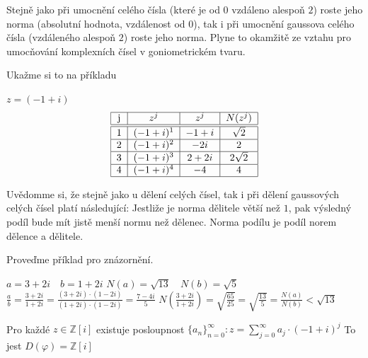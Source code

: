 \documentclass[czech,bachelor,dept470,male]{diploma}
\begin{document}
\begin{remark}
	Stejně jako při umocnění celého čísla (které je od $0$ vzdáleno alespoň $2$) roste jeho norma (absolutní hodnota, vzdálenost od $0$), tak i při umocnění gaussova celého čísla (vzdáleného alespoň $2$) roste jeho norma. Plyne to okamžitě ze vztahu pro umocňování komplexních čísel v goniometrickém tvaru.
\end{remark}
Ukažme si to na příkladu
\begin{example}
	$z=(-1+i)$
	\begin{equation}
		\begin{tabular}{|c|c|c|c|}\hline
			j & $z^j$      & $z^j$  & $N(z^j)$    \\ \hline\hline
			1 & $(-1+i)^1$ & $-1+i$ & $\sqrt{2}$  \\ \hline
			2 & $(-1+i)^2$ & $-2i$  & 2           \\ \hline
			3 & $(-1+i)^3$ & $2+2i$ & $2\sqrt{2}$ \\ \hline
			4 & $(-1+i)^4$ & $-4$   & 4           \\ \hline
		\end{tabular}
	\end{equation}
\end{example}
\begin{remark}\label{divisionNormRemark}
	Uvědomme si, že stejně jako u dělení celých čísel, tak i při dělení gaussových celých čísel platí následující:\newline
	Jestliže je norma dělitele větší než $1$, pak výsledný podíl bude mít jistě menší normu než dělenec. Norma podílu je podíl norem dělence a dělitele.
\end{remark}Proveďme příklad pro znázornění.
\begin{example}
	$a=3+2i\quad b=1+2i$\newline
	$N(a) = \sqrt{13} \quad N(b)= \sqrt{5}$\newline
	$\frac{a}{b}=\frac{3+2i}{1+2i}=\frac{(3+2i)\cdot(1-2i)}{(1+2i)\cdot(1-2i)}=\frac{7-4i}{5}$\newline
	$N\left(\frac{3+2i}{1+2i}\right)=\sqrt{\frac{65}{25}}=\sqrt{\frac{13}{5}}=\frac{N(a)}{N(b)}<\sqrt{13}$
\end{example}
\begin{theorem}
	Pro každé $z \in \mathbb{Z}[i]$ existuje posloupnost $\{a_n\}_{n=0}^\infty:z=
		\sum_{j=0}^{\infty}a_j\cdot(-1+i)^j$\newline
	To jest $D(\varphi)=\mathbb{Z}[i]$
\end{theorem}
\end{document}
